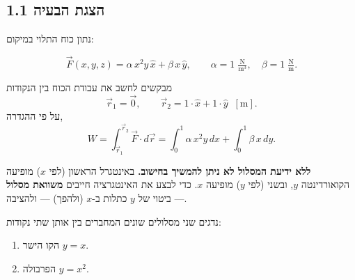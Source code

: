 \documentclass[12pt, a4paper]{article}
\newcommand{\hvec}[1]{\overrightarrow{#1}}
\begin{document}
\subsection*{1.1 הצגת הבעיה}

נתון כוח התלוי במיקום:
\begin{tcolorbox}[resultbox]
\[
  \hvec{F}(x,y,z) = \alpha\,x^2 y\,\hat{x} + \beta\,x\,\hat{y},
  \qquad
  \alpha = 1\;\tfrac{\text{N}}{\text{m}^3},
  \quad
  \beta  = 1\;\tfrac{\text{N}}{\text{m}}.
\]
\end{tcolorbox}

מבקשים לחשב את עבודת הכוח בין הנקודות
\[
  \hvec{r}_1 = \hvec{0},
  \qquad
  \hvec{r}_2 = 1\cdot\hat{x} + 1\cdot\hat{y}\;\;[\text{m}].
\]
על פי ההגדרה,
\[
  W = \int_{\hvec{r}_1}^{\hvec{r}_2} \hvec{F}\cdot d\hvec{r}
    = \int_0^1 \alpha\,x^2 y\,dx + \int_0^1 \beta\,x\,dy .
\]

\begin{tcolorbox}[warnbox, title={מה עושים עם זה?}]
\textbf{ללא ידיעת המסלול לא ניתן להמשיך בחישוב.} באינטגרל הראשון (לפי \textenglish{$x$}) מופיעה הקואורדינטה \textenglish{$y$}, ובשני (לפי \textenglish{$y$}) מופיעה \textenglish{$x$}. כדי לבצע את האינטגרציה חייבים \textbf{משוואת מסלול} --- ביטוי של \textenglish{$y$} כתלות ב-\textenglish{$x$} (ולהפך) --- ולהציבה.
\end{tcolorbox}

נדגים שני מסלולים שונים המחברים בין אותן שתי נקודות:
\begin{enumerate}
  \item הקו הישר \textenglish{$y = x$}.
  \item הפרבולה \textenglish{$y = x^2$}.
\end{enumerate}

\begin{center}
\end{center}
\end{document}
